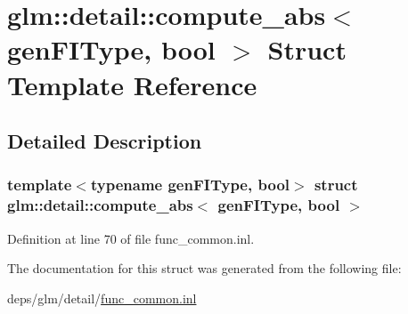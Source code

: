 \hypertarget{structglm_1_1detail_1_1compute__abs}{}\section{glm\+:\+:detail\+:\+:compute\+\_\+abs$<$ gen\+F\+I\+Type, bool $>$ Struct Template Reference}
\label{structglm_1_1detail_1_1compute__abs}


\subsection{Detailed Description}
\subsubsection*{template$<$typename gen\+F\+I\+Type, bool$>$\newline
struct glm\+::detail\+::compute\+\_\+abs$<$ gen\+F\+I\+Type, bool $>$}



Definition at line 70 of file func\+\_\+common.\+inl.



The documentation for this struct was generated from the following file\+:\begin{DoxyCompactItemize}
\item 
deps/glm/detail/\hyperlink{func__common_8inl}{func\+\_\+common.\+inl}\end{DoxyCompactItemize}
